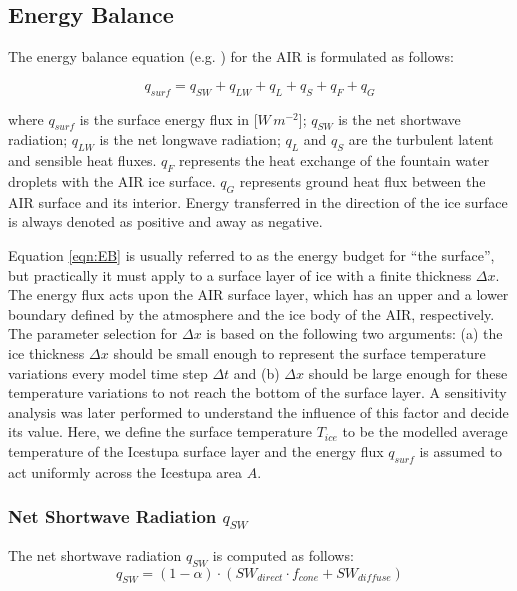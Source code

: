 \documentclass[utf8]{frontiersSCNS} %
\begin{document}
\subsection{Energy Balance} \label{section:EB}

The energy balance equation (e.g. \cite{Hock_2005}) for the AIR is formulated as follows:

\begin{equation} q_{surf} = q_{SW} + q_{LW} + q_{L} + q_{S} + q_{F} + q_{G}\label{eqn:EB} \end{equation}

where $q_{surf}$ is the surface energy flux in [$W\,m^{-2}$]; $q_{SW}$ is the net shortwave radiation; $q_{LW}$ is the
net longwave radiation; $q_{L}$ and $q_{S}$ are the turbulent latent and sensible heat fluxes. $q_{F}$ represents the
heat exchange of the fountain water droplets with the AIR ice surface. $q_{G}$ represents ground heat flux between the
AIR surface and its interior. Energy transferred in the direction of the ice surface is always denoted as positive and
away as negative.

Equation \ref{eqn:EB} is usually referred to as the energy budget for “the surface”, but practically it must apply to a
surface layer of ice with a finite thickness $\Delta x$. The energy flux acts upon the AIR surface layer, which has an
upper and a lower boundary defined by the atmosphere and the ice body of the AIR, respectively. The parameter selection
for $\Delta x$ is based on the following two arguments: (a) the ice thickness $\Delta x$ should be small enough to
represent the surface temperature variations every model time step $\Delta t$ and (b) $\Delta x$ should be large enough
for these temperature variations to not reach the bottom of the surface layer. A sensitivity analysis was later
performed to understand the influence of this factor and decide its value. Here, we define the surface temperature
$T_{ice}$ to be the modelled average temperature of the Icestupa surface layer and the energy flux $q_{surf}$ is assumed
to act uniformly across the Icestupa area $A$.

\subsubsection{Net Shortwave Radiation \texorpdfstring{$q_{SW}$}{Lg}}

The net shortwave radiation $q_{SW}$ is computed as follows:
\begin{equation} q_{SW} = (1- \alpha)\cdot (SW_{direct} \cdot f_{cone} + SW_{diffuse}) \label{eqn:SW} \end{equation}
\end{document}

